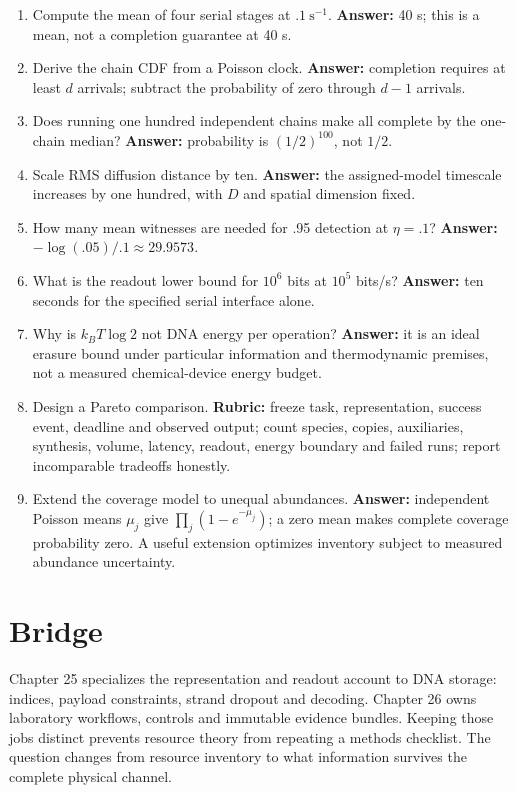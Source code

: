 \begin{enumerate}
the exponential mean is its reciprocal rate.
\item Compute the mean of four serial stages at $.1\ \mathrm{s}^{-1}$.
\textbf{Answer:} 40 s; this is a mean, not a completion guarantee at 40 s.
\item Derive the chain CDF from a Poisson clock.
\textbf{Answer:} completion requires at least $d$ arrivals; subtract the probability
of zero through $d-1$ arrivals.
\item Does running one hundred independent chains make all complete by the
one-chain median? \textbf{Answer:} probability is $(1/2)^{100}$, not $1/2$.
\item Scale RMS diffusion distance by ten.
\textbf{Answer:} the assigned-model timescale increases by one hundred, with $D$
and spatial dimension fixed.
\item How many mean witnesses are needed for .95 detection at $\eta=.1$?
\textbf{Answer:} $-\log(.05)/.1\approx29.9573$.
\item What is the readout lower bound for $10^6$ bits at $10^5$ bits/s?
\textbf{Answer:} ten seconds for the specified serial interface alone.
\item Why is $k_BT\log2$ not DNA energy per operation?
\textbf{Answer:} it is an ideal erasure bound under particular information and
thermodynamic premises, not a measured chemical-device energy budget.
\item Design a Pareto comparison.
\textbf{Rubric:} freeze task, representation, success event, deadline and observed
output; count species, copies, auxiliaries, synthesis, volume, latency, readout,
energy boundary and failed runs; report incomparable tradeoffs honestly.
\item Extend the coverage model to unequal abundances.
\textbf{Answer:} independent Poisson means $\mu_j$ give
$\prod_j(1-e^{-\mu_j})$; a zero mean makes complete coverage probability zero.
A useful extension optimizes inventory subject to measured abundance uncertainty.
\end{enumerate}

\section{Bridge}
Chapter 25 specializes the representation and readout account to DNA storage:
indices, payload constraints, strand dropout and decoding. Chapter 26 owns
laboratory workflows, controls and immutable evidence bundles. Keeping those
jobs distinct prevents resource theory from repeating a methods checklist.
The question changes from resource inventory to what information survives the
complete physical channel.
